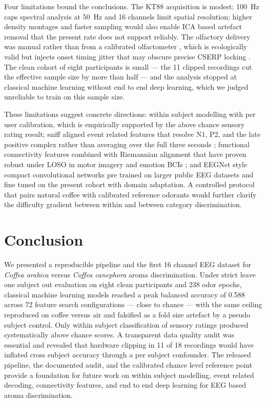 \documentclass[conference]{IEEEtran}
\begin{document}
Four limitations bound the conclusions. The KT88 acquisition is modest: 100~Hz caps spectral analysis at 50~Hz and 16 channels limit spatial resolution; higher density montages and faster sampling would also enable ICA based artefact removal that the present rate does not support reliably. The olfactory delivery was manual rather than from a calibrated olfactometer \cite{kroupi2014,kobal1981}, which is ecologically valid but injects onset timing jitter that may obscure precise CSERP locking \cite{iravani2022}. The clean cohort of eight participants is small --- the 11 clipped recordings cut the effective sample size by more than half --- and the analysis stopped at classical machine learning without end to end deep learning, which we judged unreliable to train on this sample size.

These limitations suggest concrete directions: within subject modelling with per user calibration, which is empirically supported by the above chance sensory rating result; sniff aligned event related features that resolve N1, P2, and the late positive complex rather than averaging over the full three seconds \cite{pause2000,iravani2022}; functional connectivity features combined with Riemannian alignment that have proven robust under LOSO in motor imagery and emotion BCIs \cite{barachant2013}; and EEGNet style compact convolutional networks \cite{lawhern2018} pre trained on larger public EEG datasets and fine tuned on the present cohort with domain adaptation. A controlled protocol that pairs natural coffee with calibrated reference odorants would further clarify the difficulty gradient between within and between category discrimination.

\section{Conclusion}
We presented a reproducible pipeline and the first 16 channel EEG dataset for \textit{Coffea arabica} versus \textit{Coffea canephora} aroma discrimination. Under strict leave one subject out evaluation on eight clean participants and 238 odor epochs, classical machine learning models reached a peak balanced accuracy of 0.588 across 72 feature search configurations --- close to chance --- with the same ceiling reproduced on coffee versus air and falsified as a fold size artefact by a pseudo subject control. Only within subject classification of sensory ratings produced systematically above chance scores. A transparent data quality audit was essential and revealed that hardware clipping in 11 of 18 recordings would have inflated cross subject accuracy through a per subject confounder. The released pipeline, the documented audit, and the calibrated chance level reference point provide a foundation for future work on within subject modelling, event related decoding, connectivity features, and end to end deep learning for EEG based aroma discrimination.
\end{document}
